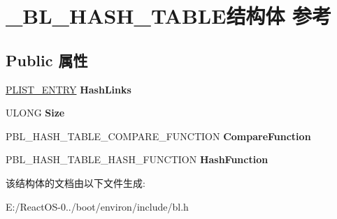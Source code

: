 \hypertarget{struct___b_l___h_a_s_h___t_a_b_l_e}{}\section{\+\_\+\+B\+L\+\_\+\+H\+A\+S\+H\+\_\+\+T\+A\+B\+L\+E结构体 参考}
\label{struct___b_l___h_a_s_h___t_a_b_l_e}
\subsection*{Public 属性}
\begin{DoxyCompactItemize}
\item 
\mbox{\label{struct___b_l___h_a_s_h___t_a_b_l_e_a6c749799a39bb4df411d1e30a40a91e1}} 
\hyperlink{struct___l_i_s_t___e_n_t_r_y}{P\+L\+I\+S\+T\+\_\+\+E\+N\+T\+RY} {\bfseries Hash\+Links}
\item 
\mbox{\label{struct___b_l___h_a_s_h___t_a_b_l_e_ad41fa48d149b8a37f4edec172b648fe3}} 
U\+L\+O\+NG {\bfseries Size}
\item 
\mbox{\label{struct___b_l___h_a_s_h___t_a_b_l_e_a837b27a849bdf49f7d8a2a438a2136d9}} 
P\+B\+L\+\_\+\+H\+A\+S\+H\+\_\+\+T\+A\+B\+L\+E\+\_\+\+C\+O\+M\+P\+A\+R\+E\+\_\+\+F\+U\+N\+C\+T\+I\+ON {\bfseries Compare\+Function}
\item 
\mbox{\label{struct___b_l___h_a_s_h___t_a_b_l_e_a81cd7d8d4523f893a9fa703f7aa9b45e}} 
P\+B\+L\+\_\+\+H\+A\+S\+H\+\_\+\+T\+A\+B\+L\+E\+\_\+\+H\+A\+S\+H\+\_\+\+F\+U\+N\+C\+T\+I\+ON {\bfseries Hash\+Function}
\end{DoxyCompactItemize}


该结构体的文档由以下文件生成\+:\begin{DoxyCompactItemize}
\item 
E\+:/\+React\+O\+S-\/0../boot/environ/include/bl.\+h\end{DoxyCompactItemize}
